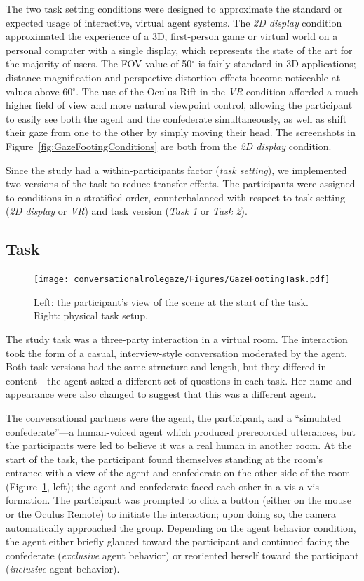 The two task setting conditions were designed to approximate the standard or expected usage of interactive, virtual agent systems. The \emph{2D display} condition approximated the experience of a 3D, first-person game or virtual world on a personal computer with a single display, which represents the state of the art for the majority of users. The FOV value of 50$^\circ$ is fairly standard in 3D applications; distance magnification and perspective distortion effects become noticeable at values above 60$^\circ$. The use of the Oculus Rift in the \emph{VR} condition afforded a much higher field of view and more natural viewpoint control, allowing the participant to easily see both the agent and the confederate simultaneously, as well as shift their gaze from one to the other by simply moving their head. The screenshots in Figure~\ref{fig:GazeFootingConditions} are both from the \emph{2D display} condition.

Since the study had a within-participants factor (\emph{task setting}), we implemented two versions of the task to reduce transfer effects. The participants were assigned to conditions in a stratified order, counterbalanced with respect to task setting (\emph{2D display} or \emph{VR}) and task version (\emph{Task 1} or \emph{Task 2}).

\subsection{Task}

\begin{figure}
\centering
\texttt{[image: conversationalrolegaze/Figures/GazeFootingTask.pdf]}
\caption{Left: the participant's view of the scene at the start of the task. Right: physical task setup.}
\label{fig:GazeFootingTask}
\end{figure}

The study task was a three-party interaction in a virtual room. The interaction took the form of a casual, interview-style conversation moderated by the agent. Both task versions had the same structure and length, but they differed in content---the agent asked a different set of questions in each task. Her name and appearance were also changed to suggest that this was a different agent.

The conversational partners were the agent, the participant, and a ``simulated confederate''---a human-voiced agent which produced prerecorded utterances, but the participants were led to believe it was a real human in another room. At the start of the task, the participant found themselves standing at the room's entrance with a view of the agent and confederate on the other side of the room (Figure~\ref{fig:GazeFootingTask}, left); the agent and confederate faced each other in a vis-a-vis formation. The participant was prompted to click a button (either on the mouse or the Oculus Remote) to initiate the interaction; upon doing so, the camera automatically approached the group. Depending on the agent behavior condition, the agent either briefly glanced toward the participant and continued facing the confederate (\emph{exclusive} agent behavior) or reoriented herself toward the participant (\emph{inclusive} agent behavior).


